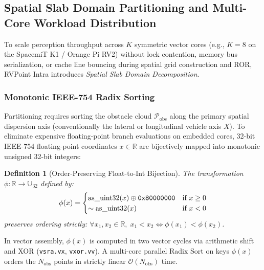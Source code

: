 \documentclass[journal,compsoc]{IEEEtran}
\newtheorem{definition}{Definition}
\begin{document}
\subsection{Spatial Slab Domain Partitioning and Multi-Core Workload Distribution}
\label{sec:slab_decomp}

To scale perception throughput across $K$ symmetric vector cores (e.g., $K=8$ on the SpacemiT K1 / Orange Pi RV2) without lock contention, memory bus serialization, or cache line bouncing during spatial grid construction and ROR, RVPoint Intra introduces \textit{Spatial Slab Domain Decomposition}.

\subsubsection{Monotonic IEEE-754 Radix Sorting}
Partitioning requires sorting the obstacle cloud $\mathcal{P}_{\text{obs}}$ along the primary spatial dispersion axis (conventionally the lateral or longitudinal vehicle axis $X$). To eliminate expensive floating-point branch evaluations on embedded cores, 32-bit IEEE-754 floating-point coordinates $x \in \mathbb{R}$ are bijectively mapped into monotonic unsigned 32-bit integers:
\begin{definition}[Order-Preserving Float-to-Int Bijection]
The transformation $\phi: \mathbb{R} \to \mathbb{U}_{32}$ defined by:
\begin{equation}
\phi(x) = \begin{cases}
\text{as\_uint32}(x) \oplus \text{\texttt{0x80000000}} & \text{if } x \ge 0 \\
\sim\text{as\_uint32}(x) & \text{if } x < 0
\end{cases}
\label{eq:float_bijection}
\end{equation}
preserves ordering strictly: $\forall x_1, x_2 \in \mathbb{R}, \; x_1 < x_2 \iff \phi(x_1) < \phi(x_2)$.
\end{definition}
In vector assembly, $\phi(x)$ is computed in two vector cycles via arithmetic shift and XOR (\texttt{vsra.vx}, \texttt{vxor.vv}). A multi-core parallel Radix Sort on keys $\phi(x)$ orders the $N_{\text{obs}}$ points in strictly linear $\mathcal{O}(N_{\text{obs}})$ time.
\end{document}
